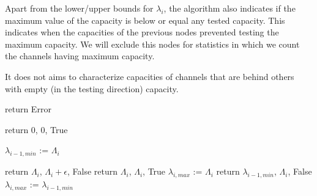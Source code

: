 Apart from the lower/upper bounds for $\lambda_i$, the algorithm also indicates 
if the maximum value of the capacity is below or equal any tested capacity. 
This indicates when the capacities of the previous nodes prevented testing the maximum capacity.
We will exclude this nodes for statistics in which we count the channels having maximum capacity.

It does not aims to characterize capacities of channels that are behind others with empty (in the testing direction) capacity.


\begin{algorithm}
    \begin{algorithmic}[1]

        \State return Error
    \EndIf

        \State return 0, 0, True
    \EndIf
        
    

            \State $\lambda_{i-1, min}$ := $\Lambda_i$
        \EndIf
    \EndIf

              
            \State return $\Lambda_i$, $\Lambda_i + \epsilon$, False
            \Else
                \State return $\Lambda_i$, $\Lambda_i$, True
            \EndIf
        \Else
            $\lambda_{i, max}$ := $\Lambda_i$
        \EndIf
    \Else
            \State return $\lambda_{i-1, min}$, $\Lambda_i$, False
        \Else
            $\lambda_{i, max}$ := $\lambda_{i-1, min}$
        \EndIf
    \EndIf


\end{algorithmic}
\end{algorithm}
